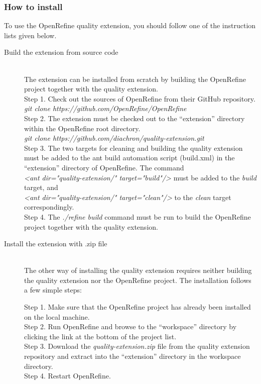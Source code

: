 \subsubsection{How to install}
To use the OpenRefine quality extension, you should follow one of the instruction lists given below.
\begin{description}
  \item[Build the extension from source code] \hfill \\
    The extension can be installed from scratch by building the OpenRefine project together with the quality extension.\\
    
  	Step 1. Check out the sources of OpenRefine from their GitHub repository.\\ 
    \textit{git clone https://github.com/OpenRefine/OpenRefine}\\
  
	Step 2. The extension must be checked out to the “extension” directory within the OpenRefine root directory.\\
	\textit{git clone https://github.com/diachron/quality-extension.git}\\
	
	Step 3. The two targets for cleaning and building the quality extension must be added to the ant build automation script (build.xml) in the “extension” directory of OpenRefine. The command \\ \textit{<ant dir="quality-extension/" target="build"/>} must be added to the \textit{build} target, and \\ \textit{<ant dir="quality-extension/" target="clean"/>} to the \textit{clean} target correspondingly.\\
	
	Step 4. The \textit{./refine build} command must be run to build the OpenRefine project together with the quality extension.
  
  \item[Install the extension with .zip file] \hfill \\
	The other way of installing the quality extension requires neither building the quality extension nor the OpenRefine project.  The installation follows a few simple steps:
	
	Step 1. Make sure that the OpenRefine project has already been installed on the local machine.\\
	
	Step 2. Run OpenRefine and browse to the “workspace” directory by clicking the link at the bottom of the project list.\\
	
	Step 3. Download the \textit{quality-extension.zip} file from the quality extension repository and extract into the “extension” directory in the workspace directory.\\
	
	Step 4. Restart OpenRefine.

\end{description}

